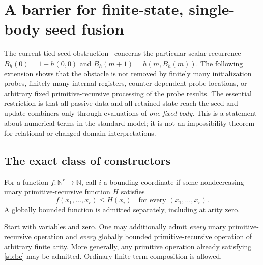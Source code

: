 \section{A barrier for finite-state, single-body seed fusion}
\label{sec:single-body-barrier}

The current tied-seed obstruction~\cite{transient,counter} concerns the particular scalar recurrence
$B_h(0)=1+h(0,0)$ and $B_h(m+1)=h(m,B_h(m))$.  The following extension
shows that the obstacle is not removed by finitely many initialization
probes, finitely many internal registers, counter-dependent probe locations,
or arbitrary fixed primitive-recursive processing of the probe results.
The essential restriction is that all passive data and all retained state
reach the seed and update combiners only through evaluations of
\emph{one fixed body}.  This is a statement about numerical terms in the
standard model; it is not an impossibility theorem for relational or
changed-domain interpretations.

\subsection{The exact class of constructors}

For a function $f:\mathbb N^r\to\mathbb N$, call $i$ a bounding coordinate
if some nondecreasing unary primitive-recursive function $H$ satisfies
\[
 f(x_1,\ldots,x_r)\le H(x_i)
 \quad\text{for every }(x_1,\ldots,x_r).
 \tag{BC}\label{sb:bc}
\]
A globally bounded function is admitted separately, including at arity zero.

Start with variables and zero.  One may additionally admit \emph{every}
unary primitive-recursive operation and \emph{every} globally bounded
primitive-recursive operation of arbitrary finite arity.  More generally,
any primitive operation already satisfying \eqref{sb:bc} may be admitted.
Ordinary finite term composition is allowed.

